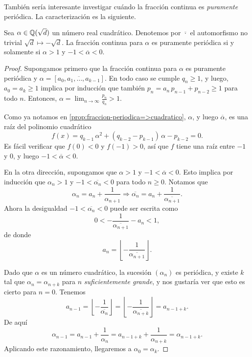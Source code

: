 También sería interesante investigar cuándo la fracción continua es
\emph{puramente} periódica. La caracterización es la siguiente.

\begin{teorema}
  Sea $\alpha \in \mathbb{Q} (\sqrt{d})$ un número real cuadrático. Denotemos por
  $\overline{\cdot}$ el automorfismo no trivial $\sqrt{d} \mapsto -\sqrt{d}$.
  La fracción continua para $\alpha$ es puramente periódica si y solamente si
  $\alpha > 1$ y $-1 < \overline{\alpha} < 0$.

  \begin{proof}
    Supongamos primero que la fracción continua para $\alpha$ es puramente
    periódica y $\alpha = [\overline{a_0,a_1,\ldots,a_{k-1}}]$. En todo caso se
    cumple $q_n \ge 1$, y luego, $a_0 = a_k \ge 1$ implica por inducción que
    también ${p_n = a_n\,p_{n-1} + p_{n-2} \ge 1}$ para todo $n$. Entonces,
    $\alpha = \lim_{n\to\infty} \frac{p_n}{q_n} > 1$.

    Como ya notamos en \ref{prop:fraccion-periodica=>cuadratico}, $\alpha$,
    y luego $\overline{\alpha}$, es una raíz del polinomio cuadrático
    $$f (x) = q_{k-1}\,\alpha^2 + (q_{k-2} - p_{k-1})\,\alpha - p_{k-2} = 0.$$
    Es fácil verificar que $f (0) < 0$ y $f (-1) > 0$, así que $f$ tiene una raíz
    entre $-1$ y $0$, y luego $-1 < \overline{\alpha} < 0$.

    \vspace{1em}

    En la otra dirección, supongamos que $\alpha > 1$ y
    $-1 < \overline{\alpha} < 0$. Esto implica por inducción que $\alpha_n > 1$
    y $-1 < \overline{\alpha_n} < 0$ para todo $n \ge 0$. Notamos que
    \[ \alpha_n = a_n + \frac{1}{\alpha_{n+1}} \Longrightarrow
       \overline{\alpha_n} = a_n + \frac{1}{\overline{\alpha_{n+1}}}. \]
    Ahora la desigualdad $-1 < \overline{\alpha_n} < 0$ puede ser escrita como
    $$0 < -\frac{1}{\overline{\alpha_{n+1}}} - a_n < 1,$$
    de donde
    $$a_n = \left\lfloor-\frac{1}{\overline{\alpha_{n+1}}}\right\rfloor.$$

    Dado que $\alpha$ es un número cuadrático, la sucesión $(\alpha_n)$ es
    periódica, y existe $k$ tal que $\alpha_n = \alpha_{n+k}$ para $n$
    \emph{suficientemente grande}, y nos gustaría ver que esto es cierto para
    $n = 0$. Tenemos
    \[ a_{n-1} = \left\lfloor-\frac{1}{\overline{\alpha_n}}\right\rfloor =
       \left\lfloor-\frac{1}{\overline{\alpha_{n+k}}}\right\rfloor = a_{n-1+k}. \]
    De aquí
    \[ \alpha_{n-1} = a_{n-1} + \frac{1}{\alpha_n} =
       a_{n-1+k} + \frac{1}{\alpha_{n+k}} = \alpha_{n-1+k}. \]
    Aplicando este razonamiento, llegaremos a $\alpha_0 = \alpha_k$.
  \end{proof}
\end{teorema}

